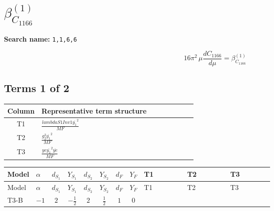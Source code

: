 \documentclass[8pt]{article}
\begin{document}
\begin{landscape}
\begin{longtable}{@{}llcccccc >{\raggedright\arraybackslash}p{0.21\linewidth} >{\raggedright\arraybackslash}p{0.21\linewidth} >{\raggedright\arraybackslash}p{0.21\linewidth}@{}}
\midrule
\bottomrule
\end{longtable}
\clearpage
\section*{$\beta_{C_{1166}}^{(1)}$}
\noindent\textbf{Search name: }\texttt{1,1,6,6}\par\smallskip
\[16\pi^2\,\mu\frac{d C_{1166}}{d\mu}=\beta_{C_{1166}}^{(1)}\]
\subsection*{Terms 1 of 2}
\begin{center}
\begin{tabular}{@{}c >{\raggedright\arraybackslash}p{0.82\linewidth}@{}}
\toprule
Column & Representative term structure \\
\midrule
T1 & \(\displaystyle \frac{lambdaS1Inv1 \overline{y_{1}}^{2}}{MF}\) \\
\midrule
T2 & \(\displaystyle \frac{g_{2}^{2} \overline{y_{1}}^{2}}{MF}\) \\
\midrule
T3 & \(\displaystyle \frac{ye \overline{y_{1}}^{2} \overline{ye}}{MF}\) \\
\midrule
\bottomrule
\end{tabular}
\end{center}
\smallskip
\tiny
\begin{longtable}{@{}llcccccc >{\raggedright\arraybackslash}p{0.21\linewidth} >{\raggedright\arraybackslash}p{0.21\linewidth} >{\raggedright\arraybackslash}p{0.21\linewidth}@{}}
\toprule
Model & $\alpha$ & $d_{S_1}$ & $Y_{S_1}$ & $d_{S_2}$ & $Y_{S_2}$ & $d_F$ & $Y_F$ & T1 & T2 & T3 \\
\midrule
\endfirsthead
\toprule
Model & $\alpha$ & $d_{S_1}$ & $Y_{S_1}$ & $d_{S_2}$ & $Y_{S_2}$ & $d_F$ & $Y_F$ & T1 & T2 & T3 \\
\midrule
\endhead
T3-B & $-1$ & $2$ & $-\frac{1}{2}$ & $2$ & $\frac{1}{2}$ & $1$ & $0$ & \scriptsize\adjustbox{max width=\linewidth}{$\begin{gathered} \frac{lambdaS1Inv1 \overline{y_{1}}^{2}}{2 MF}\end{gathered}$} & \scriptsize\adjustbox{max width=\linewidth}{$\begin{gathered} \frac{3 g_{2}^{2} \overline{y_{1}}^{2}}{4 MF}\end{gathered}$} & \scriptsize\adjustbox{max width=\linewidth}{$\begin{gathered} - \frac{ye \overline{y_{1}}^{2} \overline{ye}}{4 MF}\end{gathered}$} \\

\end{longtable}
\end{landscape}
\end{document}
